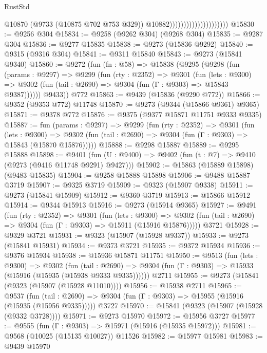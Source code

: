 \begin{lexlean}{RustStd}
\begin{coremodule}
{\begin{coremodule}
{{{{{{{{{{{{{{{{{{{{{{{{{{{{{{{{{{{{{{{{{{{{{{{{{{{{{{{                                              @10870
                                              (@9733 (@10875 @702 @753 @329))
                                              @10882)))))))))))))))))))))
@15830 := @9256 @304
@15834 := @9258 (@9262 @304) (@9268 @304)
@15835 := @9287 @304
@15836 := @9277 @15835
@15838 := @9273 (@15836 @9292)
@15840 := @9315 (@9316 @304)
@15841 := @9311 @15840
@15843 := @9273 (@15841 @9340)
@15860 := @9272
    (fun (fn : @58) =>
    @15838
      (@9295
        (@9298
          (fun (params : @9297) =>
          @9299
            (fun (rty : @2352) =>
            @9301
              (fun (lets : @9300) =>
              @9302 (fun (tail : @2690) => @9304 (fun (Γ : @9303) => @15843 @9387))))))
        @9433))
    @772
@15863 := @9439 (@15836 (@9290 @772))
@15866 := @9352 (@9353 @772) @11748
@15870 := @9273 (@9344 (@15866 @9361) @9365)
@15871 := @9378 @772
@15876 := @9375 (@9377 @15871 @11751 @9333 @9335)
@15887 := fun (params : @9297) =>
  @9299
    (fun (rty : @2352) =>
    @9301
      (fun (lets : @9300) =>
      @9302 (fun (tail : @2690) => @9304 (fun (Γ : @9303) => @15843 (@15870 @15876)))))
@15888 := @9298 @15887
@15889 := @9295 @15888
@15898 := @9401
    (fun (U : @9400) => @9402 (fun (t : @7) => @9410 (@9273 (@9416 @11748 @9291) @9427)))
@15902 := @15863 (@15889 @15898) (@9483 @15835)
@15904 := @9258 @15888 @15898
@15906 := @9488 @15887 @3719
@15907 := @9325 @3719
@15909 := @9323 (@15907 @9338)
@15911 := @9273 (@15841 @15909)
@15912 := @9360 @3719
@15913 := @15866 @15912
@15914 := @9344 @15913
@15916 := @9273 (@15914 @9365)
@15927 := @9491
    (fun (rty : @2352) =>
    @9301
      (fun (lets : @9300) =>
      @9302 (fun (tail : @2690) => @9304 (fun (Γ : @9303) => @15911 (@15916 @15876)))))
    @3721
@15928 := @9329 @3721
@15931 := @9323 (@15907 (@15928 @9337))
@15933 := @9273 (@15841 @15931)
@15934 := @9373 @3721
@15935 := @9372 @15934
@15936 := @9376 @15934
@15938 := @15936 @15871 @11751
@15950 := @9513
    (fun (lets : @9300) =>
    @9302
      (fun (tail : @2690) =>
      @9304 (fun (Γ : @9303) => @15933 (@15916 (@15935 (@15938 @9333 @9335))))))
    @2711
@15955 := @9273 (@15841 (@9323 (@15907 (@15928 @11010))))
@15956 := @15938 @2711
@15965 := @9537
    (fun (tail : @2690) => @9304 (fun (Γ : @9303) => @15955 (@15916 (@15935 (@15956 @9335)))))
    @3727
@15970 := @15841 (@9323 (@15907 (@15928 (@9332 @3728))))
@15971 := @9273 @15970
@15972 := @15956 @3727
@15977 := @9555 (fun (Γ : @9303) => @15971 (@15916 (@15935 @15972)))
@15981 := @9568 (@10025 (@15135 @10027)) @11526
@15982 := @15977 @15981
@15983 := @9439 @15970
}}}}}}}}}}}}}}}}}}}}}}}}}}}}}}}}}}}}}}}}}}}}}}}}}}}}}}}
\end{coremodule}}
\end{coremodule}
\end{lexlean}
